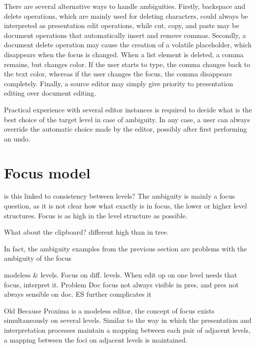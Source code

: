 There are several alternative ways to handle ambiguities. Firstly, backspace and delete operations, which are mainly used for deleting characters, could always be interpreted as presentation edit operations, while cut, copy, and paste may be document operations that automatically insert and remove commas. Secondly, a document delete operation may cause the creation of a volatile placeholder, which disappears when the focus is changed. When a list element is deleted, a comma remains, but changes color. If the user starts to type, the comma changes back to the text color, whereas if the user changes the focus, the comma disappears completely. Finally, a source editor may simply give priority to presentation editing over document editing. 

Practical experience with several editor instances is required to decide what is the best choice of the target level in case of ambiguity. In any case, a user can always override the automatic choice made by the editor, possibly after first performing an undo.




%																
%																
%																
\section{Focus model} \label{sect:focus}

\bc
is this linked to consistency between levels?
The ambiguity is mainly a focus question, as it is not clear how what exactly is in focus, the lower or higher level structures. Focus is as high in the level structure as possible.

What about the clipboard?
different high than in tree.

In fact, the ambiguity examples from the previous section are problems with the ambiguity of the focus
\ec

\bc modeless & levels. Focus on diff. levels. When edit op on one level needs that focus, interpret it. Problem Doc focus not always visible in pres, and pres not always sensible on doc. ES further complicates it
\ec


\bc Old
Because Proxima is a modeless editor, the concept of focus exists simultaneously on several levels.  Similar to the way in which the presentation and interpretation processes maintain a mapping between each pair of adjacent levels, a mapping between the foci on adjacent levels is maintained. 
\ec

